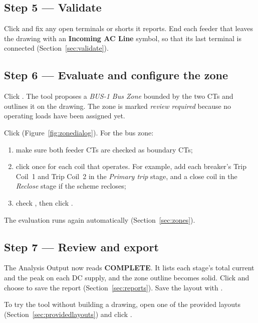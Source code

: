 \subsection*{Step 5 --- Validate}
Click  and fix any open terminals or shorts it reports. End
each feeder that leaves the drawing with an \textbf{Incoming AC Line} symbol, so that
its last terminal is connected (Section~\ref{sec:validate}).

\subsection*{Step 6 --- Evaluate and configure the zone}
Click . The tool proposes a \emph{BUS-1 Bus Zone}
bounded by the two CTs and outlines it on the drawing. The zone is marked
\emph{review required} because no operating loads have been assigned yet.

Click  (Figure~\ref{fig:zonedialog}). For the bus
zone:
\begin{enumerate}
  \item make sure both feeder CTs are checked as boundary CTs;
  \item click  once for each coil that operates. For example, add each
        breaker's Trip Coil~1 and Trip Coil~2 in the \emph{Primary trip} stage, and a
        close coil in the \emph{Reclose} stage if the scheme recloses;
  \item check ,
        then click .
\end{enumerate}
The evaluation runs again automatically (Section~\ref{sec:zones}).

\subsection*{Step 7 --- Review and export}
The Analysis Output now reads \textbf{COMPLETE}. It lists each stage's total current
and the peak on each DC supply, and the zone outline becomes solid. Click
 and choose  to save the report
(Section~\ref{sec:reports}). Save the layout with .

\begin{note}
To try the tool without building a drawing, open one of the provided layouts
(Section~\ref{sec:providedlayouts}) and click .

\end{note}

